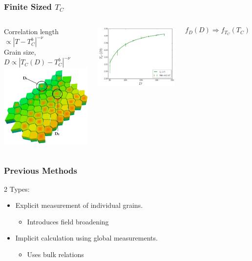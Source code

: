 \documentclass{beamer}
\begin{document}
\begin{frame}
	\frametitle{Finite Sized $T_C$}
	\begin{columns}
		\column{6cm}
		\begin{center}
		Correlation length $\propto |T-T_C^b|^{-\nu}$ \\ \vspace{3mm}
		Grain size, $D \propto |T_C(D)-T_C^b|^{-\nu}$ \\ \vspace{3mm}
		\includegraphics[width=5cm]{Images/grains2}
		\end{center}
		\column{6cm}
		\begin{center}
		\includegraphics[width=5cm]{Images/TcD}
		\end{center} \vspace{4mm}
		$$
		f_D(D) \Longrightarrow f_{T_C}(T_C)
		$$
	\end{columns}
\end{frame}

\begin{frame}
	\frametitle{Previous Methods}
	2 Types:
	\vspace{4mm}
	\begin{itemize}
		\item{Explicit measurement of individual grains.\footnotemark[3]}
		\begin{itemize}
			\item{Introduces field broadening}
		\end{itemize}
		\vspace{4mm}
		\item{Implicit calculation using global measurements.\footnotemark[4]}
		\begin{itemize}
			\item{Uses bulk relations}
		\end{itemize}
	\end{itemize}	
\end{frame}
\end{document}
